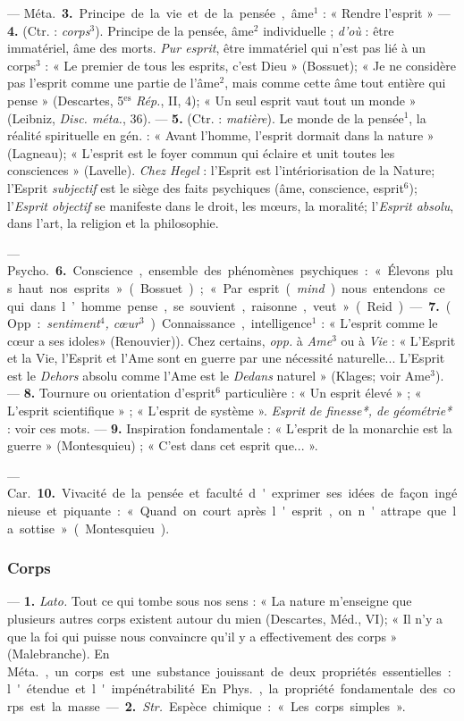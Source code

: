 — \si{Méta.} {\bf 3.} Principe de la vie et de
la pensée, âme$^1$ : « Rendre l'esprit »
— {\bf 4.} (Ctr. : {\it corps}$^3$). Principe de la
pensée, âme$^2$ individuelle ; {\it d'où} :
être immatériel, âme des morts.
{\it Pur esprit}, être immatériel qui n’est
pas lié à un corps$^3$ : « Le premier de
tous les esprits, c’est Dieu » (Bossuet); « Je ne considère pas l'esprit
comme une partie de l'âme$^2$, mais
comme cette âme tout entière qui
pense » (Descartes, 5$^\text{es}$ {\it Rép.}, II, 4);
« Un seul esprit vaut tout un monde »
(Leibniz, {\it Disc. méta.}, 36). — {\bf 5.} (Ctr. :
{\it matière}). Le monde de la pensée$^1$, la
réalité spirituelle en gén. : « Avant
l’homme, l'esprit dormait dans la
nature » (Lagneau); « L'esprit est
le foyer commun qui éclaire et unit
toutes les consciences » (Lavelle).
{\it Chez Hegel} : l'Esprit est l’intériorisation
de la Nature; l'Esprit {\it subjectif} est le siège des faits psychiques
(âme, conscience, esprit$^6$); l'{\it Esprit objectif} se manifeste
dans le droit, les mœurs, la moralité; l'{\it Esprit absolu}, dans l’art,
la religion et la philosophie.

— \si{Psycho.} {\bf 6.} Conscience, ensemble des phénomènes psychiques :
« Élevons plus haut nos esprits »
(Bossuet); « Par esprit ({\it mind}) nous
entendons ce qui dans l’homme
pense, se souvient, raisonne, veut »
(Reid). — {\bf 7.} (Opp. : {\it sentiment$^4$,
cœur$^3$}). Connaissance, intelligence$^1$ :
« L'esprit comme le cœur a ses idoles»
(Renouvier)). Chez certains, {\it opp.} à
{\it Ame}$^3$ ou à {\it Vie} : « L'Esprit et la Vie,
l'Esprit et l'Ame sont en guerre par
une nécessité naturelle... L'Esprit
est le {\it Dehors} absolu comme l’Ame
est le {\it Dedans} naturel » (Klages;
voir Ame$^3$). — {\bf 8.} Tournure ou orientation d’esprit$^6$
particulière : « Un esprit élevé » ; « L'esprit scientifique » ;
« L'esprit de système ». {\it Esprit de finesse*, de géométrie*} :
voir ces mots. — {\bf 9.} Inspiration fondamentale : « L’esprit de la
monarchie est la guerre » (Montesquieu) ; « C’est dans cet esprit que... ».

— \si{Car.} {\bf 10.} Vivacité de la pensée
et faculté d'exprimer ses idées de
façon ingénieuse et piquante :
« Quand on court après l'esprit, on
n'attrape que la sottise » (Montesquieu).

\subsubsection{Corps}
 — {\bf 1.}  {\it Lato.} Tout ce qui tombe
sous nos sens : « La nature m'enseigne que plusieurs autres corps
existent autour du mien (Descartes,
Méd., VI); « Il n’y a que la foi qui
puisse nous convaincre qu'il y a
effectivement des corps » (Malebranche). En \si{Méta.}, un corps est
une substance jouissant de deux
propriétés essentielles : l'étendue et
l'impénétrabilité. En \si{Phys.}, la propriété fondamentale des corps est la
masse. — {\bf 2.}  {\it Str.} Espèce chimique :
« Les corps simples ».

